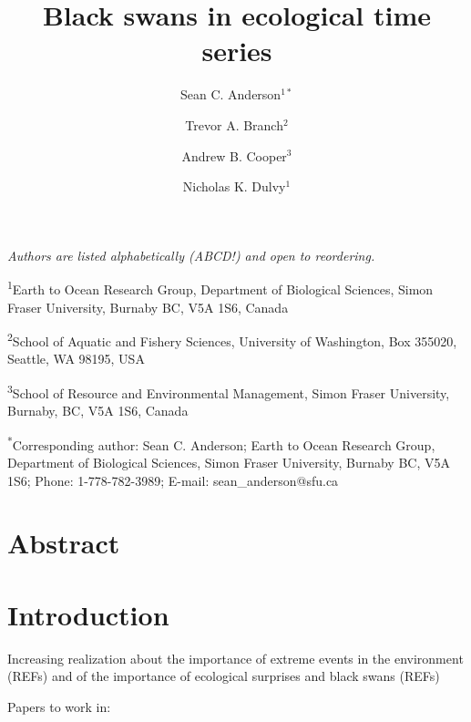\documentclass[11pt]{article}
\title{Black swans in ecological time series}
\author{
Sean C. Anderson$^{1\ast}$ \and
Trevor A. Branch$^2$ \and
Andrew B. Cooper$^3$ \and
Nicholas K. Dulvy$^1$
}
\date{}
\begin{document}

\onehalfspacing

\maketitle
\thispagestyle{empty}

\noindent
\textit{Authors are listed alphabetically (ABCD!) and open to reordering.}

\noindent
\textsuperscript{1}Earth to Ocean Research Group, Department of Biological Sciences, Simon Fraser University, Burnaby BC, V5A 1S6, Canada

\noindent
\textsuperscript{2}School of Aquatic and Fishery Sciences, University of Washington, Box 355020, Seattle, WA 98195, USA

\noindent
\textsuperscript{3}School of Resource and Environmental Management, Simon Fraser University, Burnaby, BC, V5A 1S6, Canada

\noindent
\textsuperscript{*}Corresponding author: Sean C. Anderson; Earth to Ocean Research Group, Department of Biological Sciences, Simon Fraser University, Burnaby BC, V5A 1S6; Phone: 1-778-782-3989; E-mail: sean\_anderson@sfu.ca

\clearpage

\setcounter{page}{1}
\section{Abstract}

\section{Introduction}

Increasing realization about the importance of extreme events in the environment (REFs)
and of the importance of ecological surprises and black swans (REFs)

Papers to work in:

\citep{inchausti2002,halley2002,inchausti2001}

\citep{jentsch2007}

\citep{ward2007}

\citep{garcia-carreras2011}
\citep{sornette2009}

\citep{nunez2012}

\citep{thompson2013}
\citep{beaugrand2012}
\citep{pine-iii2009}
\end{document}
